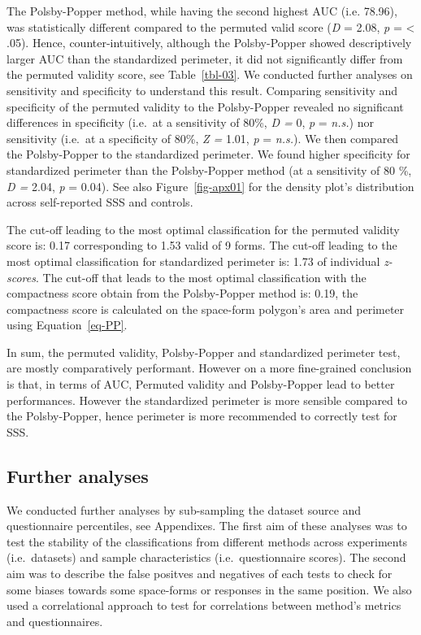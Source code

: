 \documentclass[
  man,
  floatsintext,
  longtable,
  a4paper,
  nolmodern,
  notxfonts,
  notimes,
  colorlinks=true,linkcolor=blue,citecolor=blue,urlcolor=blue]{apa7}
\begin{document}
The Polsby-Popper method, while having the second highest AUC (i.e.
78.96), was statistically different compared to the permuted valid score
(\emph{D} = 2.08, \emph{p} = \textless{} .05). Hence,
counter-intuitively, although the Polsby-Popper showed descriptively
larger AUC than the standardized perimeter, it did not significantly
differ from the permuted validity score, see Table~\ref{tbl-03}. We
conducted further analyses on sensitivity and specificity to understand
this result. Comparing sensitivity and specificity of the permuted
validity to the Polsby-Popper revealed no significant differences in
specificity (i.e.~at a sensitivity of 80\%, \emph{D =} 0, \emph{p} =
\emph{n.s.}) nor sensitivity (i.e.~at a specificity of 80\%, \emph{Z =}
1.01, \emph{p} = \emph{n.s.}). We then compared the Polsby-Popper to the
standardized perimeter. We found higher specificity for standardized
perimeter than the Polsby-Popper method (at a sensitivity of 80 \%,
\emph{D =} 2.04, \emph{p} = 0.04). See also Figure~\ref{fig-apx01} for
the density plot's distribution across self-reported SSS and controls.

The cut-off leading to the most optimal classification for the permuted
validity score is: 0.17 corresponding to 1.53 valid of 9 forms. The
cut-off leading to the most optimal classification for standardized
perimeter is: 1.73 of individual \emph{z-scores}. The cut-off that leads
to the most optimal classification with the compactness score obtain
from the Polsby-Popper method is: 0.19, the compactness score is
calculated on the space-form polygon's area and perimeter using
Equation~\ref{eq-PP}.

In sum, the permuted validity, Polsby-Popper and standardized perimeter
test, are mostly comparatively performant. However on a more
fine-grained conclusion is that, in terms of AUC, Permuted validity and
Polsby-Popper lead to better performances. However the standardized
perimeter is more sensible compared to the Polsby-Popper, hence
perimeter is more recommended to correctly test for SSS.

\subsection{Further analyses}\label{further-analyses}

We conducted further analyses by sub-sampling the dataset source and
questionnaire percentiles, see Appendixes. The first aim of these
analyses was to test the stability of the classifications from different
methods across experiments (i.e.~datasets) and sample characteristics
(i.e.~questionnaire scores). The second aim was to describe the false
positves and negatives of each tests to check for some biases towards
some space-forms or responses in the same position. We also used a
correlational approach to test for correlations between method's metrics
and questionnaires.
\end{document}
